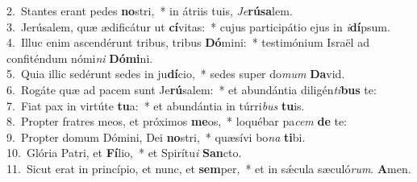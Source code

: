 {2.~}Stantes erant pedes \textbf{no}stri,~* in átriis tuis, \textit{Je}\textbf{rú}\textbf{sa}lem.\\
{3.~}Jerúsalem, quæ ædificátur ut \textbf{cí}vitas:~* cujus participátio ejus in \textit{i}\textbf{dí}psum.\\
{4.~}Illuc enim ascendérunt tribus, tribus \textbf{Dó}mini:~* testimónium Israël ad confiténdum nómi\textit{ni} \textbf{Dó}\textbf{mi}ni.\\
{5.~}Quia illic sedérunt sedes in ju\textbf{dí}cio,~* sedes super do\textit{mum} \textbf{Da}vid.\\
{6.~}Rogáte quæ ad pacem sunt Je\textbf{rú}salem:~* et abundántia diligén\textit{ti}\textbf{bus} te:\\
{7.~}Fiat pax in virtúte \textbf{tu}a:~* et abundántia in túrri\textit{bus} \textbf{tu}is.\\
{8.~}Propter fratres meos, et próximos \textbf{me}os,~* loquébar pa\textit{cem} \textbf{de} te:\\
{9.~}Propter domum Dómini, Dei \textbf{no}stri,~* quæsívi bo\textit{na} \textbf{ti}bi.\\
{10.~}Glória Patri, et \textbf{Fí}lio,~* et Spirítu\textit{i} \textbf{San}cto.\\
{11.~}Sicut erat in princípio, et nunc, et \textbf{sem}per,~* et in sǽcula sæculó\textit{rum}. \textbf{A}men.\\
